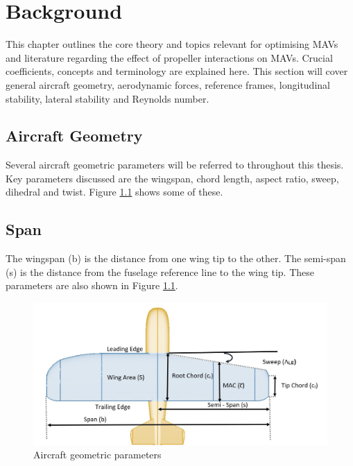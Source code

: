 
\graphicspath{{./Figs/}}

\chapter{Background} 
This chapter outlines the core theory and topics relevant for optimising \acrshort{MAV}s and literature regarding the effect of propeller interactions on \acrshort{MAV}s. Crucial coefficients, concepts and terminology are explained here. This section will cover general aircraft geometry, aerodynamic forces, reference frames, longitudinal stability, lateral stability and Reynolds number. 

\section{Aircraft Geometry}
Several aircraft geometric parameters will be referred to throughout this thesis. Key parameters discussed are the wingspan, chord length, aspect ratio, sweep, dihedral and twist. Figure \ref{fig:aircraftgeometry} shows some of these.

\section{Span}
The wingspan (\acrshort{b}) is the distance from one wing tip to the other. The semi-span (\acrshort{s}) is the distance from the fuselage reference line to the wing tip. These parameters are also shown in Figure \ref{fig:aircraftgeometry}. 

\begin{figure}[H]
  \centering
   \includegraphics[width=1\linewidth]{03_LiteratureReview/Figs/geometry.JPG}
  \caption{Aircraft geometric parameters}
  \label{fig:aircraftgeometry}
\end{figure}


